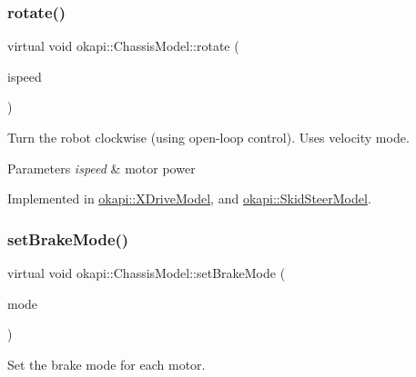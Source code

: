 \mbox{\label{classokapi_1_1ChassisModel_af13aa5281c762eb61a444f0b35176014}} 
\subsubsection{\texorpdfstring{rotate()}{rotate()}}
{\footnotesize\ttfamily virtual void okapi\+::\+Chassis\+Model\+::rotate (\begin{DoxyParamCaption}\item[{double}]{ispeed }\end{DoxyParamCaption})\hspace{0.3cm}{\ttfamily [pure virtual]}}

Turn the robot clockwise (using open-\/loop control). Uses velocity mode.


\begin{DoxyParams}{Parameters}
{\em ispeed} & motor power \\
\hline
\end{DoxyParams}


Implemented in \mbox{\hyperlink{classokapi_1_1XDriveModel_ab9a2d6f5e1f44b2c8640d41a534d4869}{okapi\+::\+X\+Drive\+Model}}, and \mbox{\hyperlink{classokapi_1_1SkidSteerModel_af02dab85c80cf8aa226b33a39851feff}{okapi\+::\+Skid\+Steer\+Model}}.

\mbox{\label{classokapi_1_1ChassisModel_a20e3cde96d536e6c722aa5686e5cc8e8}} 
\subsubsection{\texorpdfstring{setBrakeMode()}{setBrakeMode()}}
{\footnotesize\ttfamily virtual void okapi\+::\+Chassis\+Model\+::set\+Brake\+Mode (\begin{DoxyParamCaption}\item[{\mbox{\hyperlink{classokapi_1_1AbstractMotor_a132e0485dbb59a60c3f934338d8fa601}{Abstract\+Motor\+::brake\+Mode}}}]{mode }\end{DoxyParamCaption})\hspace{0.3cm}{\ttfamily [pure virtual]}}

Set the brake mode for each motor.


